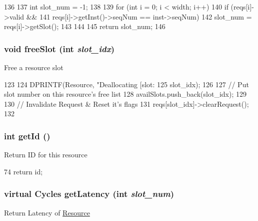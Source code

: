 \begin{DoxyCode}
136 {
137     int slot_num = -1;
138 
139     for (int i = 0; i < width; i++) {
140         if (reqs[i]->valid &&
141             reqs[i]->getInst()->seqNum == inst->seqNum) {
142             slot_num = reqs[i]->getSlot();
143         }
144     }
145     return slot_num;
146 }
\end{DoxyCode}
\hypertarget{classResource_a19ec1254d9f9be5b3058fad36034f7da}{
\subsubsection[{freeSlot}]{\setlength{\rightskip}{0pt plus 5cm}void freeSlot (int {\em slot\_\-idx})}}
\label{classResource_a19ec1254d9f9be5b3058fad36034f7da}
Free a resource slot 


\begin{DoxyCode}
123 {
124     DPRINTF(Resource, "Deallocating [slot:%
125             slot_idx);
126 
127     // Put slot number on this resource's free list
128     availSlots.push_back(slot_idx);
129 
130     // Invalidate Request & Reset it's flags
131     reqs[slot_idx]->clearRequest();
132 }
\end{DoxyCode}
\hypertarget{classResource_a67283be3f45257d1e0c474c563ebb6b6}{
\subsubsection[{getId}]{\setlength{\rightskip}{0pt plus 5cm}int getId ()}}
\label{classResource_a67283be3f45257d1e0c474c563ebb6b6}
Return ID for this resource 


\begin{DoxyCode}
74 { return id; }
\end{DoxyCode}
\hypertarget{classResource_a0d3550b57856a6b656d76b87a9d6b6e8}{
\subsubsection[{getLatency}]{\setlength{\rightskip}{0pt plus 5cm}virtual {\bf Cycles} getLatency (int {\em slot\_\-num})}}
\label{classResource_a0d3550b57856a6b656d76b87a9d6b6e8}
Return Latency of \hyperlink{classResource}{Resource} 


